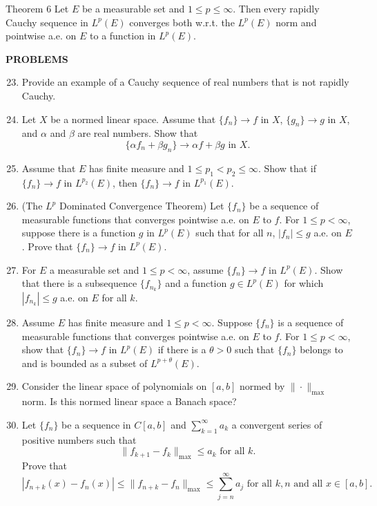 \begin{namedthm*}{Theorem 6}
	Let $E$ be a measurable set and $1\le p\le\infty$.
	Then every rapidly Cauchy sequence in $L^p(E)$ converges both w.r.t. the $L^p(E)$ norm and pointwise a.e. on $E$ to a function in $L^p(E)$.
\end{namedthm*}

\begin{center}
	\textbf{PROBLEMS}
\end{center}
\begin{enumerate}
	\setcounter{enumi}{22}
	\item Provide an example of a Cauchy sequence of real numbers that is not rapidly Cauchy.
	\item Let $X$ be a normed linear space.
	Assume that $\{f_n\}\to f$ in $X$, $\{g_n\}\to g$ in $X$, and $\alpha$ and $\beta$ are real numbers.
	Show that
	\[
		\{\alpha f_n+\beta g_n\}\to\alpha f+\beta g\text{ in }X.
	\]
	\item Assume that $E$ has finite measure and $1\le p_1< p_2\le\infty$.
	Show that if $\{f_n\}\to f$ in $L^{p_2}(E)$, then $\{f_n\}\to f$ in $L^{p_1}(E)$.
	\item (The $L^p$ Dominated Convergence Theorem) Let $\{f_n\}$ be a sequence of measurable functions that converges pointwise a.e. on $E$ to $f$.
	For $1\le p<\infty$, suppose there is a function $g$ in $L^p(E)$ such that for all $n$, $|f_n|\le g$ a.e. on $E$.
	Prove that $\{f_n\}\to f$ in $L^p(E)$.
	\item For $E$ a measurable set and $1\le p<\infty$, assume $\{f_n\}\to f$ in $L^p(E)$.
	Show that there is a subsequence $\{f_{n_k}\}$ and a function $g\in L^p(E)$ for which $|f_{n_k}|\le g$ a.e. on $E$ for all $k$.
	\item Assume $E$ has finite measure and $1\le p<\infty$.
	Suppose $\{f_n\}$ is a sequence of measurable functions that converges pointwise a.e. on $E$ to $f$.
	For $1\le p<\infty$, show that $\{f_n\}\to f$ in $L^p(E)$ if there is a $\theta>0$ such that $\{f_n\}$ belongs to and is bounded as a subset of $L^{p+\theta}(E)$.
	\item Consider the linear space of polynomials on $[a,b]$ normed by $\|\cdot\|_{\max}$ norm.
	Is this normed linear space a Banach space?
	\item Let $\{f_n\}$ be a sequence in $C[a,b]$ and $\sum_{k=1}^\infty a_k$ a convergent series of positive numbers such that
	\[
		\|f_{k+1}-f_k\|_{\max}\le a_k\text{ for all }k.
	\]
	Prove that
	\[
		|f_{n+k}(x)-f_n(x)|\le\|f_{n+k}-f_n\|_{\max}\le\sum_{j=n}^\infty a_j\text{ for all }k,n\text{ and all }x\in[a,b].
\]
\end{enumerate}
